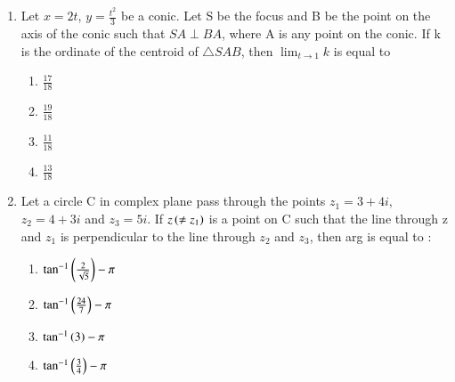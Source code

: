 \documentclass[journal]{IEEEtran}
\numberwithin{equation}{enumi}
\numberwithin{figure}{enumi}
\begin{document}
\begin{enumerate}
\begin{enumerate}
	\end{enumerate}
\item Let $x=2t$, $y=\frac{t^2}{3}$ be a conic. Let S be the focus and B be the point on the axis of the conic such that $SA \perp BA$, where A is any point on the conic. If k is the ordinate of the centroid of $\triangle SAB$, then $\lim_{t \to 1}{k}$ is equal to
	\begin{enumerate}
		\item $\frac{17}{18}$
		\item $\frac{19}{18}$
		\item $\frac{11}{18}$
		\item $\frac{13}{18}$
	\end{enumerate}
\item Let a circle C in complex plane pass through the points $z_1=3+4i$, $z_2=4+3i$ and $z_3=5i$. If $z\left(\neq z_1\right)$ is a point on C such that the line through z and $z_1$ is perpendicular to the line through $z_2$ and $z_3$, then arg is equal to :
	\begin{enumerate}
		\item $\tan^{-1}\left(\frac{2}{\sqrt{5}}\right) - \pi$
		\item $\tan^{-1}\left(\frac{24}{7}\right) - \pi$
		\item $\tan^{-1}\left(3\right) - \pi$
		\item $\tan^{-1}\left(\frac{3}{4}\right) - \pi$
	\end{enumerate}
\end{enumerate}
\end{document}
